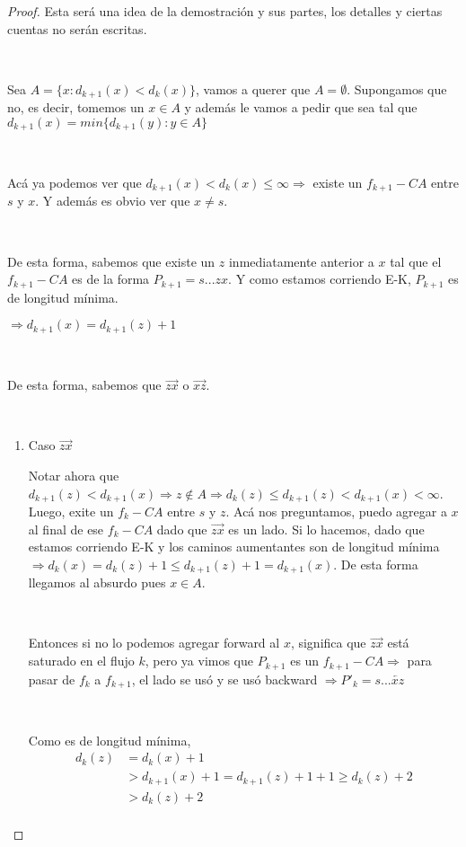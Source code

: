 \documentclass[11pt]{article}
\begin{document}
\begin{proof}
Esta será una idea de la demostración y sus partes, los detalles y ciertas cuentas no serán escritas.\par
\

Sea $A = \{x : d_{k+1}(x) < d_k(x)\}$, vamos a querer que $A = \emptyset$. Supongamos que no, es decir, tomemos un $x \in  A$ y además le vamos a pedir que sea tal que $d_{k+1}(x) = min\{d_{k+1}(y) : y\in A \}$\par
\

Acá ya podemos ver que $d_{k+1}(x) < d_k(x) \le \infty \Rightarrow$ existe un $f_{k+1}-CA$ entre $s$ y $x$. Y además es obvio ver que $x \ne s$.\par
\

De esta forma, sabemos que existe un $z$ inmediatamente anterior a $x$ tal que el $f_{k+1}-CA$ es de la forma $P_{k+1} = s...zx$. Y como estamos corriendo E-K, $P_{k+1}$ es de longitud mínima.\par
\begin{center}
$\Rightarrow d_{k+1}(x) = d_{k+1}(z) + 1$
\end{center} \par 
\

De esta forma, sabemos que $\overrightarrow{zx}$ o $ \overrightarrow{xz}$.\par
\

\begin{enumerate}
\item Caso  $\overrightarrow{zx}$\par
Notar ahora que $d_{k+1}(z) < d_{k+1}(x) \Rightarrow z \notin A \Rightarrow d_k(z) \le d_{k+1}(z) < d_{k+1}(x) < \infty$. Luego, exite un $f_k -CA$ entre $s$ y $z$. Acá nos preguntamos, puedo agregar a $x$ al final de ese $f_k - CA$ dado que  $\overrightarrow{zx}$ es un lado. Si lo hacemos, dado que estamos corriendo E-K y los caminos aumentantes son de longitud mínima $\Rightarrow d_k(x) = d_k(z) + 1 \le d_{k+1}(z) + 1 = d_{k+1}(x)$. De esta forma llegamos al absurdo pues $x \in A$.\par
\

Entonces si no lo podemos agregar forward al $x$, significa que $ \overrightarrow{zx}$ está saturado en el flujo $k$, pero ya vimos que $P_{k+1}$ es un $f_{k+1}-CA \Rightarrow$ para pasar de $f_k$ a $f_{k+1}$, el lado se usó y se usó backward $\Rightarrow P'_k = s...\overleftarrow{xz} $\par
\

Como es de longitud mínima, 
\begin{align*}
d_k(z) & = d_k(x) + 1 \\
	   & > d_{k+1}(x) +1 = d_{k+1}(z) + 1 + 1 \ge d_k(z) + 2\\
	   & > d_k(z) + 2 \\
\end{align*}


\end{enumerate}
\end{proof}
\end{document}
